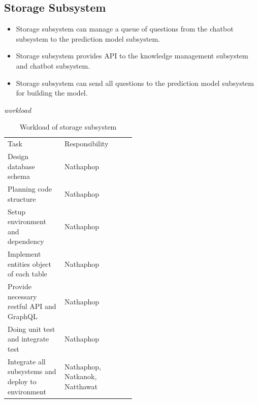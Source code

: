\documentclass[12pt,oneside,openright,a4paper]{cpe-english-project}
\begin{document}
	\subsection{Storage Subsystem}
	\begin{itemize}
		\item Storage subsystem can manage a queue of questions from the chatbot subsystem to the prediction model subsystem.
		\item Storage subsystem provides API to the knowledge management subsystem and chatbot subsystem.
		\item Storage subsystem can send all questions to the prediction model subsystem for building the model.
	\end{itemize}
\emph{workload}
\begin{table}[h]
	\centering
	\caption{Workload of storage subsystem}
	\label{tab:Workload of storage subsystem}
\begin{adjustbox}{width=\textwidth}
\begin{tabular}{lp{0.5\linewidth}l}
		\rowcolor[HTML]{5B9BD5} 
		Task                                               & Responsibility                 \\
		\rowcolor[HTML]{DEEAF6} 
		Design database schema                             & Nathaphop                      \\
		Planning code structure                            & Nathaphop                      \\
		\rowcolor[HTML]{DEEAF6} 
		Setup environment and dependency                   & Nathaphop                      \\
		Implement entities object of each table            & Nathaphop                      \\
		\rowcolor[HTML]{DEEAF6} 
		Provide necessary restful API and GraphQL          & Nathaphop                      \\
		Doing unit test and integrate test                 & Nathaphop                      \\
		\rowcolor[HTML]{DEEAF6} 
		Integrate all subsystems and deploy to environment & Nathaphop, Natkanok, Natthawat 
	\end{tabular}
\end{adjustbox}
\end{table}

\pagebreak
\end{document}
